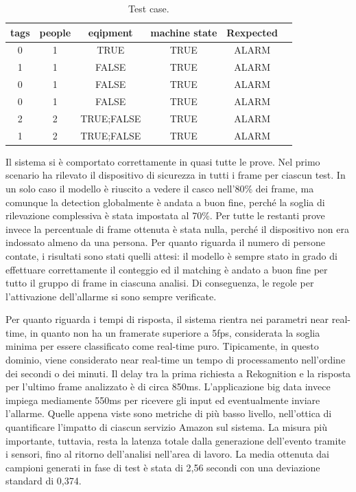 \begin{table}[htbp]
\centering
\begin{tabular}{|c|c|c|c|c|c|}
\toprule
\textbf{tags} & \textbf{people} & \textbf{eqipment} & \textbf{machine state} & \textbf{Rexpected} \\ \midrule

 0 & 1 & TRUE & TRUE & ALARM  \\ \midrule
 1 & 1 & FALSE & TRUE & ALARM     \\ \midrule
 0 & 1 & FALSE & TRUE & ALARM    \\ \midrule
 0 & 1 & FALSE & TRUE & ALARM    \\ \midrule
 2 & 2 & TRUE;FALSE & TRUE & ALARM    \\ \midrule
 1 & 2 & TRUE;FALSE & TRUE & ALARM    \\ \midrule
\end{tabular}
\caption{Test case.}
\label{tab:test-cases}
\end{table}

Il sistema si è comportato correttamente in quasi tutte le prove. Nel primo scenario ha rilevato il dispositivo di sicurezza in tutti i frame per ciascun test. In un solo caso il modello è riuscito a vedere il casco nell'80\% dei frame, ma comunque la detection globalmente è andata a buon fine, perché la soglia di rilevazione complessiva è stata impostata al 70\%. Per tutte le restanti prove invece la percentuale di frame ottenuta è stata nulla, perché il dispositivo non era indossato almeno da una persona. Per quanto riguarda il numero di persone contate, i risultati sono stati quelli attesi: il modello è sempre stato in grado di effettuare correttamente il conteggio ed il matching è andato a buon fine per tutto il gruppo di frame in ciascuna analisi. Di conseguenza, le regole per l'attivazione dell'allarme si sono sempre verificate.

Per quanto riguarda i tempi di risposta, il sistema rientra nei parametri near real-time, in quanto non ha un framerate superiore a 5fps, considerata la soglia minima per essere classificato come real-time puro. Tipicamente, in questo dominio, viene considerato near real-time un tempo di processamento nell'ordine dei secondi o dei minuti. Il delay tra la prima richiesta a Rekognition e la risposta per l'ultimo frame analizzato è di circa 850ms. L'applicazione big data invece impiega mediamente 550ms per ricevere gli input ed eventualmente inviare l'allarme. Quelle appena viste sono metriche di più basso livello, nell'ottica di quantificare l'impatto di ciascun servizio Amazon sul sistema. La misura più importante, tuttavia, resta la latenza totale dalla generazione dell'evento tramite i sensori, fino al ritorno dell'analisi nell'area di lavoro. La media ottenuta dai campioni generati in fase di test è stata di 2,56 secondi con una deviazione standard di 0,374.

